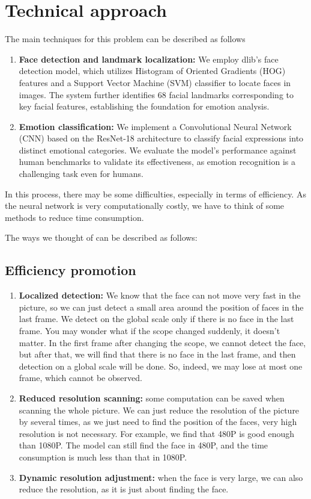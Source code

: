 \section{Technical approach}
The main techniques for this problem can be described as follows
\begin{enumerate}
		\item \textbf{Face detection and landmark localization:} We employ dlib's face detection model, which utilizes Histogram of Oriented Gradients (HOG) features and a Support Vector Machine (SVM) classifier to locate faces in images. The system further identifies 68 facial landmarks corresponding to key facial features, establishing the foundation for emotion analysis.
		\item \textbf{Emotion classification:} We implement a Convolutional Neural Network (CNN) based on the ResNet-18 architecture to classify facial expressions into distinct emotional categories. We evaluate the model's performance against human benchmarks to validate its effectiveness, as emotion recognition is a challenging task even for humans.
\end{enumerate}
In this process, there may be some difficulties, especially in terms of efficiency. As the neural network is very computationally costly, we have to think of some methods to reduce time consumption.

The ways we thought of can be described as follows:
\subsection{Efficiency promotion}
\begin{enumerate}
    \item \textbf{Localized detection:} We know that the face can not move very fast in the picture, so we can just detect a small area around the position of faces in the last frame. We detect on the global scale only if there is no face in the last frame. You may wonder what if the scope changed suddenly, it doesn't matter. In the first frame after changing the scope, we cannot detect the face, but after that, we will find that there is no face in the last frame, and then detection on a global scale will be done. So, indeed, we may lose at most one frame, which cannot be observed.
    \item \textbf{Reduced resolution scanning:} some computation can be saved when scanning the whole picture. We can just reduce the resolution of the picture by several times, as we just need to find the position of the faces, very high resolution is not necessary. For example, we find that 480P is good enough than 1080P. The model can still find the face in 480P, and the time consumption is much less than that in 1080P.
    \item \textbf{Dynamic resolution adjustment:} when the face is very large, we can also reduce the resolution, as it is just about finding the face.
\end{enumerate}
